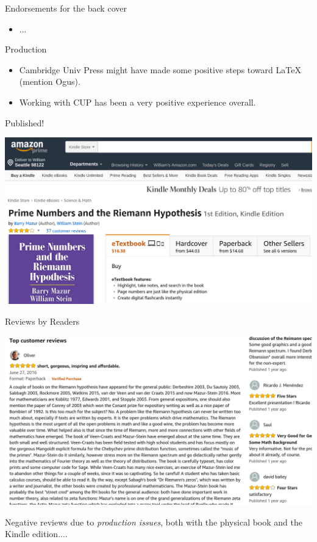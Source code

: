 \documentclass{beamer}
\begin{document}
\begin{frame}{Endorsements for the back cover}
  \begin{itemize}
    \item ...
  \end{itemize}
\end{frame}

\begin{frame}{Production}
  \begin{itemize}
    \item Cambridge Univ Press might have made some positive steps toward \LaTeX{} (mention Ogus).
    \item Working with CUP has been a very positive experience overall.
  \end{itemize}

\end{frame}

\begin{frame}{Published!}

  \includegraphics[width=.98\textwidth]{pics/amazon-prime.png}

\end{frame}



\begin{frame}{Reviews by Readers}

  \includegraphics[width=.98\textwidth]{pics/amazon-review.png}

  \vfill

  Negative reviews  due to \textit{production issues}, both with the physical book
  and the Kindle edition....

\end{frame}
\end{document}
